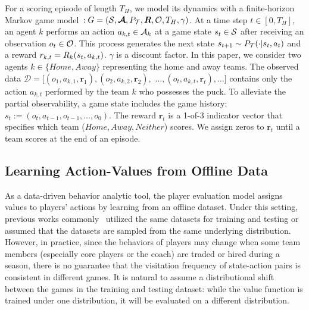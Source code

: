 \documentclass{article}
\newcommand{\horizon}{T_{H}}
\newcommand{\state}{s}
\newcommand{\observation}{o}
\newcommand{\action}{a}
\newcommand{\transition}{t}
\newcommand{\reward}{r}
\newcommand{\agentIndex}{k}
\newcommand{\gameIndex}{j}
\newcommand{\dataset}{\mathcal{D}}
\begin{document}
For a scoring episode of length $\horizon$, we model its dynamics with a finite-horizon Markov game model~\cite{Littman1994MarkovGame}$: G=(\mathcal{\MakeUppercase{\state}}, \boldsymbol{\mathcal{\MakeUppercase{\action}}}, P_{\mathcal{\MakeUppercase{\transition}}}, \boldsymbol{\MakeUppercase{\reward}}, \mathcal{\MakeUppercase{\observation}},\horizon,\gamma)$. 
At a time step $t\in[0,\horizon]$, an agent $\agentIndex$ performs an action $\action_{\agentIndex,t} \in \mathcal{\MakeUppercase{\action}}_{\agentIndex}$ at a game state $\state_{t} \in \mathcal{\MakeUppercase{\state}}$ after receiving an observation $\observation_{t} \in \mathcal{\MakeUppercase{\observation}}$. 
This process generates the next state $\state_{t+1} \sim P_{\mathcal{\MakeUppercase{\transition}}}(\cdot|\state_t, \action_t)$ and a reward
$\reward_{k,t}=\MakeUppercase{\reward}_{\agentIndex}(\state_{t},\action_{\agentIndex,t})$. $\gamma$ is a discount factor.
In this paper, we consider two agents $\agentIndex\in\{Home, Away\}$ representing the home and away teams. The observed data $\dataset=[(\observation_1,\action_{\agentIndex,1},\boldsymbol{\reward}_{1}),(\observation_2,\action_{\agentIndex,2},\boldsymbol{\reward}_{2}),$ $\ldots,(\observation_t,\action_{\agentIndex,t},\boldsymbol{\reward}_{t}),\ldots]$ contains only the action $\action_{\agentIndex,t}$ performed by the team $\agentIndex$ who possesses the puck.  To alleviate the partial observability, a game state includes the game history: $\state_{t} := (\observation_t,\action_{t-1},\observation_{t-1},\ldots,\observation_{0})$. The reward $\boldsymbol{\reward}_{t}$ is a 1-of-3 indicator vector that specifies which team ($Home, Away, Neither$) scores. We assign zeros to $\boldsymbol{\reward}_{t}$ until a team scores at the end of an episode.


\subsection{Learning Action-Values from Offline Data}
\label{subsec:offline-problem}

As a data-driven behavior analytic tool, the player evaluation model assigns values to players' actions by learning from an offline dataset. Under this setting, previous works commonly~\cite{Routley2015Markov,Liu2018DRL,Liu2020soccer,Decroos2019Actions} utilized the same datasets for training and testing or assumed that the datasets are sampled from the same underlying distribution. However, in practice, since the behaviors of players may change when some team members (especially core players or the coach) are traded or hired during a season, there is no guarantee that the visitation frequency of state-action pairs is consistent in different games. It is natural to assume a distributional shift between the games in the training and testing dataset: while the value function is trained under one distribution, it will be evaluated on a different distribution.
\end{document}

